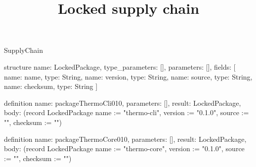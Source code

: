 \begin{lexlean}{SupplyChain}
\title{Locked supply chain}
\begin{semanticmodule}
structure{
  name: LockedPackage,
  type_parameters: [],
  parameters: [],
  fields: [
    {name: name, type: String},
    {name: version, type: String},
    {name: source, type: String},
    {name: checksum, type: String}
  ]
}

definition{
  name: packageThermoCli010,
  parameters: [],
  result: LockedPackage,
  body: (record LockedPackage {name := "thermo-cli", version := "0.1.0", source := "", checksum := ""})
}

definition{
  name: packageThermoCore010,
  parameters: [],
  result: LockedPackage,
  body: (record LockedPackage {name := "thermo-core", version := "0.1.0", source := "", checksum := ""})
}
\end{semanticmodule}
\end{lexlean}
